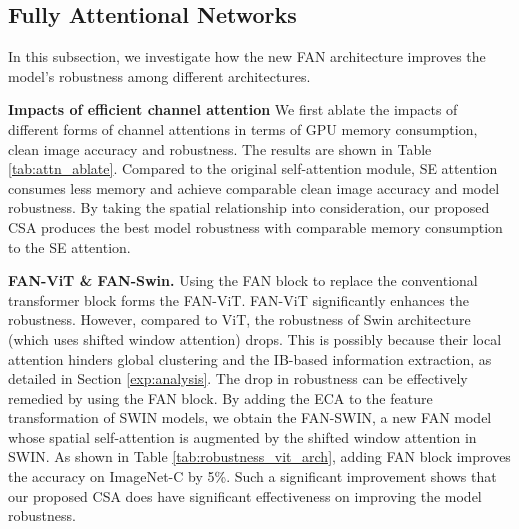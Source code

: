 \documentclass[nohyperref]{article}
\theoremstyle{plain}
\theoremstyle{definition}
\theoremstyle{remark}
\begin{document}
\subsection{Fully Attentional Networks}
In this subsection, we investigate how the new FAN architecture improves the model's robustness among different architectures. 

\textbf{Impacts of efficient channel attention} We first ablate the impacts of different forms of channel attentions in terms of GPU memory consumption, clean image accuracy and robustness. The results are shown in Table \ref{tab:attn_ablate}. Compared to the original self-attention module, SE attention consumes less memory and achieve comparable clean image accuracy and model robustness. By taking the spatial relationship into consideration, our proposed CSA produces the best model robustness with comparable memory consumption to the SE attention.

\vspace{-4mm}
\begin{table}[h]
    \small
    \caption{Effects of different channel attentions on model robustness (\%).}
    \label{tab:attn_ablate}
    \vspace{2mm}
    \centering
    \setlength{\tabcolsep}{2.5pt}
\end{table}

\textbf{FAN-ViT \& FAN-Swin.}
 Using the  FAN block  to replace the conventional transformer block forms the FAN-ViT. FAN-ViT  significantly enhances the robustness. 
However,   compared to ViT,  the robustness of Swin architecture \cite{liu2021swin} (which uses shifted window attention)  drops.  This is possibly because their local attention hinders global clustering  and  the IB-based   information extraction, as detailed in Section \ref{exp:analysis}.  The drop in robustness can be effectively remedied by using the FAN block. By adding the ECA to the feature transformation of SWIN models, we obtain the FAN-SWIN, a new FAN model whose spatial self-attention is augmented by the shifted window attention in SWIN.   As shown in Table \ref{tab:robustness_vit_arch},   adding FAN block improves the accuracy on ImageNet-C by 5\%. Such a significant improvement shows that our proposed CSA does have significant effectiveness on improving the model robustness. 
\end{document}
